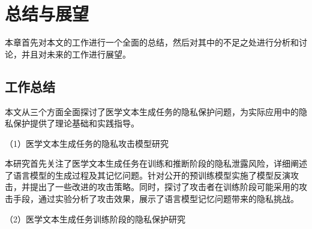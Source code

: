 
\chapter{总结与展望}

本章首先对本文的工作进行一个全面的总结，然后对其中的不足之处进行分析和讨论，并且对未来的工作进行展望。


\section{工作总结}

本文从三个方面全面探讨了医学文本生成任务的隐私保护问题，为实际应用中的隐私保护提供了理论基础和实践指导。

（1）医学文本生成任务的隐私攻击模型研究


本研究首先关注了医学文本生成任务在训练和推断阶段的隐私泄露风险，详细阐述了语言模型的生成过程及其记忆问题。针对公开的预训练模型实施了模型反演攻击，并提出了一些改进的攻击策略。同时，探讨了攻击者在训练阶段可能采用的攻击手段，通过实验分析了攻击效果，展示了语言模型记忆问题带来的隐私挑战。

（2）医学文本生成任务训练阶段的隐私保护研究


